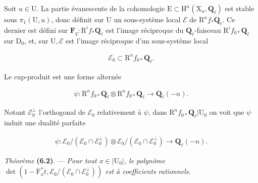 \documentclass[10pt,leqno]{article}
\begin{document}
\noindent Soit \(u\in \mathrm{U}\). La partie évanescente de la cohomologie \(\mathrm{E}\subset \mathrm{H}^{n}(\mathrm{X}_{u},\mathbf{Q}_{\ell })\) est stable sous \(\pi _{1}(\mathrm{U},u)\), donc définit sur \(\mathrm{U}\) un sous-système local \(\mathcal{E} \) de \(\mathrm{R}^{n} f_{*}\mathbf{Q}_{\ell }\). Ce dernier est défini sur \(\mathbf{F}_{q} : \mathrm{R}^{i} f_{*}\mathbf{Q}_{\ell }\) est l’image réciproque du \(\mathbf{Q}_{\ell }\)-faisceau \(\mathrm{R}^{i} f_{0*}\mathbf{Q}_{\ell }\) sur \(\mathrm{D}_{0}\), et, sur \(\mathrm{U}, \mathcal{E} \) est l’image réciproque d’un sous-système local\par

\begin{equation*}\begin{gathered}\mathcal{E} _{0} \subset  \mathrm{R}^{n} f_{0*}\mathbf{Q}_{\ell }.\end{gathered}\end{equation*}

\noindent Le cup-produit est une forme alternée\par

\begin{equation*}\begin{gathered}\psi  : \mathrm{R}^{n} f_{0*}\mathbf{Q}_{\ell }\otimes \mathrm{R}^{n} f_{0*}\mathbf{Q}_{\ell } \longrightarrow  \mathbf{Q}_{\ell }(- n).\end{gathered}\end{equation*}

\noindent Notant \(\mathcal{E} _{0}^{\perp }\) l’orthogonal de \(\mathcal{E} _{0}\) relativement à \(\psi \), dans \(\mathrm{R}^{n} f_{0*}\mathbf{Q}_{\ell }|\mathrm{U}_{0}\) on voit que \(\psi \) induit une dualité parfaite\par

\begin{equation*}\begin{gathered}\psi  : \mathcal{E} _{0}/(\mathcal{E} _{0}\cap \mathcal{E} _{0}^{\perp })\otimes \mathcal{E} _{0}/(\mathcal{E} _{0}\cap \mathcal{E} _{0}^{\perp }) \longrightarrow  \mathbf{Q}_{\ell }(- n).\end{gathered}\end{equation*}

\noindent \emph{Théorème} \textbf{(6.2)}. — {\itshape Pour tout \(x\in |\mathrm{U}_{0}|\), le polynôme \(\operatorname{det}(1- \mathrm{F}_{x}^{*}t,\mathcal{E} _{0}/(\mathcal{E} _{0}\cap \mathcal{E} _{0}^{\perp }))\) est à coefficients rationnels.}\par
\end{document}
